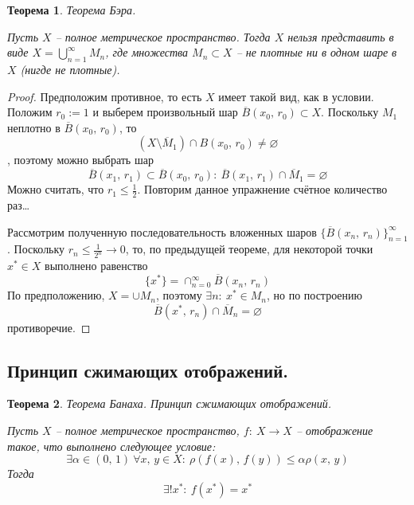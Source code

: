 \documentclass[a4paper,12pt]{article}
\renewcommand{\leq}{\ensuremath{\leqslant}}
\renewcommand{\emptyset}{\ensuremath{\varnothing}}
\theoremstyle{plain}
\newtheorem{theorem}{Теорема}[section]
\theoremstyle{definition}
\theoremstyle{remark}
\begin{document}
\begin{theorem}
	Теорема Бэра.

	Пусть $X$ -- полное метрическое пространство. Тогда $X$ нельзя представить в виде $X = \bigcup_{n = 1}^\infty M_n$, где множества $M_n \subset X$ -- не плотные ни в одном шаре в $X$ (нигде не плотные).
\end{theorem}

\begin{proof}
	Предположим противное, то есть $X$ имеет такой вид, как в условии. Положим $r_0 := 1$ и выберем произвольный шар $\overline{B}(x_0,\, r_0) \subset X$. Поскольку $M_1$ неплотно в $\overline{B}(x_0,\, r_0)$, то
	\[
		(X \setminus \overline{M}_1) \cap B(x_0,\, r_0) \neq \emptyset
	\], поэтому можно выбрать шар
	\[
		\overline{B}(x_1,\, r_1) \subset \overline{B}(x_0,\, r_0) :\: \overline{B}(x_1,\, r_1) \cap \overline{M}_1 = \emptyset
	\]
	Можно считать, что $r_1 \leq \frac{1}{2}$. Повторим данное упражнение счётное количество раз\dots

	Рассмотрим полученную последовательность вложенных шаров $\{\overline{B}(x_n,\,r_n)\}_{n = 1}^\infty$. Поскольку $r_n \leq \frac{1}{2^n} \to 0$, то, по предыдущей теореме, для некоторой точки $x^* \in X$ выполнено равенство
	\[
		\{x^*\} = \cap_{n = 0}^\infty\overline{B}(x_n,\, r_n)
	\]
	По предположению, $X = \cup M_n$, поэтому $\exists n :\: x^* \in M_n$, но по построению
	\[
		\overline{B}(x^*,\, r_n) \cap \overline{M}_n = \emptyset
	\]
	противоречие.
\end{proof}

\subsection{Принцип сжимающих отображений.}
\begin{theorem}
	Теорема Банаха. Принцип сжимающих отображений.

	Пусть $X$ -- полное метрическое пространство, $f :\: X \to X$ -- отображение такое, что выполнено следующее условие:
	\[
		\exists \alpha \in (0,\, 1) \: \forall x,\, y \in X :\: \rho(f(x),\, f(y)) \leq \alpha\rho(x,\,y)
	\]
	Тогда
	\[
		\exists ! x^* :\: f(x^*) = x^*
	\]
\end{theorem}
\end{document}
